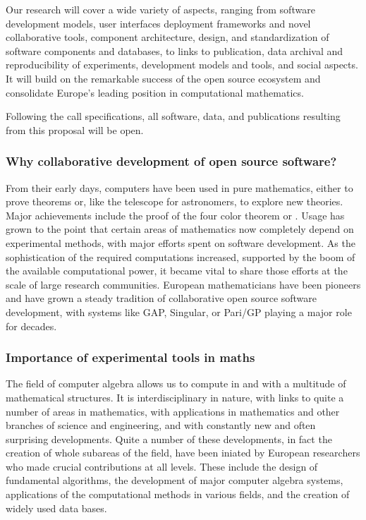 \documentclass[a4paper,11pt]{article}
\begin{document}
Our research will cover a wide variety of aspects, ranging from
software development models, user interfaces   deployment frameworks and novel collaborative tools,
component architecture, design, and standardization of software
components and databases, to links to publication, data archival and
reproducibility of experiments, development models and tools, and
social aspects. It will build on the remarkable success of the open
source ecosystem and consolidate Europe's leading position in
computational mathematics.

Following the call specifications, all software, data, and
publications resulting from this proposal will be open.

\subsubsection{Why collaborative development of open source software?}

From their early days, computers have been used in pure mathematics,
either to prove theorems or, like the telescope for astronomers, to
explore new theories. Major achievements include the proof of the four
color theorem or . Usage has grown to the
point that certain areas of mathematics now completely depend on
experimental methods, with major efforts spent on software
development. As the sophistication of the required computations
increased, supported by the boom of the available computational power,
it became vital to share those efforts at the scale of large research
communities. European mathematicians have been pioneers and have grown
a steady tradition of collaborative open source software development,
with systems like GAP, Singular, or Pari/GP playing a major role for
decades.

\subsubsection{Importance of experimental tools in maths}

The field of computer algebra allows us to compute in and with a multitude
of mathematical structures. It is interdisciplinary in nature, with links to quite
a number of areas in mathematics, with applications in mathematics and other
branches of science and engineering, and with constantly new and often
surprising developments. Quite a number of these developments, in fact the
creation of whole subareas of the field,  have been iniated by European
researchers who made crucial contributions at all levels. These include the
design of fundamental algorithms, the development of major computer
algebra systems, applications of the computational methods in various fields,
and the creation of widely used data bases.
\end{document}
